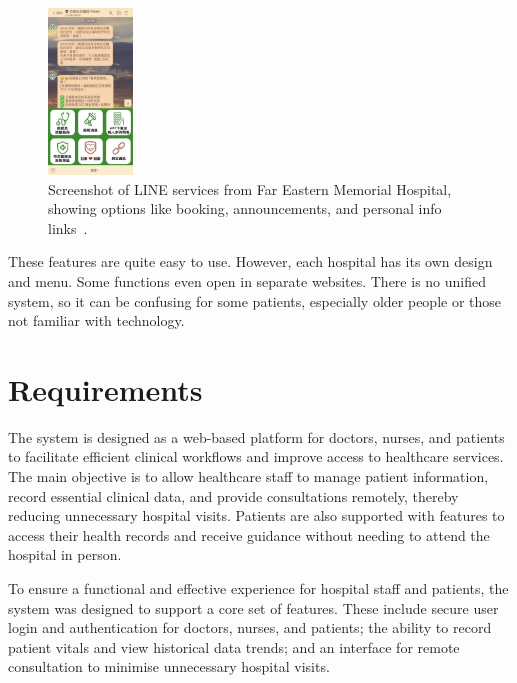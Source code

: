 \noindent
\begin{figure}[htbp]
    \centering
    \includegraphics[width=0.2\textwidth]{../../images/line.jpg}
    \caption{Screenshot of LINE services from Far Eastern Memorial Hospital, showing options like booking, announcements, and personal info links~\cite{femhline}.}
    \label{fig:line-service}
\end{figure}
\noindent

These features are quite easy to use. However, each hospital has its own design and menu. Some functions even open in separate websites. There is no unified system, so it can be confusing for some patients, especially older people or those not familiar with technology.



\clearpage


\clearpage
\section{Requirements}
\label{sec:requirements}

The system is designed as a web-based platform for doctors, nurses, and patients to facilitate efficient clinical workflows and improve access to healthcare services. The main objective is to allow healthcare staff to manage patient information, record essential clinical data, and provide consultations remotely, thereby reducing unnecessary hospital visits. Patients are also supported with features to access their health records and receive guidance without needing to attend the hospital in person.

To ensure a functional and effective experience for hospital staff and patients, the system was designed to support a core set of features. These include secure user login and authentication for doctors, nurses, and patients; the ability to record patient vitals and view historical data trends; and an interface for remote consultation to minimise unnecessary hospital visits.

